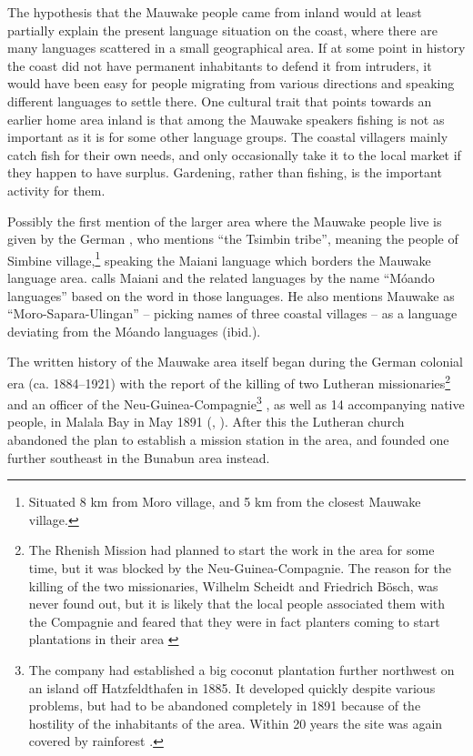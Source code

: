The hypothesis that the Mauwake people came from inland would at least partially explain the present language situation on the coast, where there are many languages scattered in a small geographical area. If at some point in history the coast did not have permanent inhabitants to defend it from intruders, it would have been easy for people migrating from various directions and speaking different languages to settle there. One cultural trait that points towards an earlier home area inland is that among the Mauwake speakers fishing is not as important as it is for some other language groups. The coastal villagers mainly catch fish for their own needs, and only occasionally take it to the local market if they happen to have surplus. Gardening, rather than fishing, is the important activity for them.

Possibly the first mention of the larger area where the Mauwake people live is given by the German \citet[338]{Hollrung1888}, who mentions ``the Tsimbin tribe'', meaning the people of Simbine village,\footnote{Situated 8 km from Moro village, and 5 km from the closest Mauwake village.} speaking the Maiani language which borders the Mauwake language area. \citet[964]{Holtker1937} calls Maiani and the related languages by the name ``M\'oando languages'' based on the word  in those languages.  He also mentions Mauwake as ``Moro-Sapara-Ulingan'' -- picking names of three coastal villages -- as a language deviating from the M\'oando languages (ibid.). 

The written history of the Mauwake area itself began during the German colonial era (ca. 1884--1921) with the report of the killing of two Lutheran missionaries\footnote{The Rhenish Mission had planned to start the work in the area for some time, but it was blocked by the Neu-Guinea-Compagnie. The reason for the killing of the two missionaries, Wilhelm Scheidt and Friedrich Bösch, was never found out, but it is likely that the local people associated them with the Compagnie and feared that they were in fact planters coming to start plantations in their area \citep[106--107]{WagnerEtAl1986}} and an officer of the Neu-Guinea-Compagnie\footnote{The company had established a big coconut plantation further northwest on an island off Hatzfeldthafen in 1885. It developed quickly despite  various problems, but had to be abandoned completely in 1891 because of the hostility of the inhabitants of the area. Within 20 years the site was again covered by rainforest \citep[450--51]{Tranel1952}.} , as well as 14 accompanying native people, in Malala Bay in May 1891 (\citealt[454]{Tranel1952}, \citealt[106--109]{WagnerEtAl1986}).  After this the Lutheran church abandoned the plan to establish a mission station in the area, and founded one further southeast in the Bunabun area instead.

